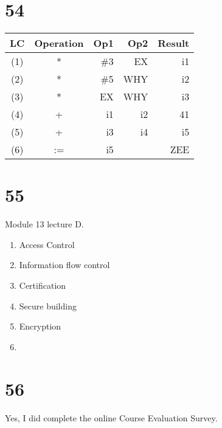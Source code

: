 \documentclass[a4paper,11pt]{article}
\begin{document}
\section*{54}
\begin{tabular}{ | c | c | r | r | r |}
  \hline
    LC & Operation & Op1 & Op2 & Result  \\ \hline
    (1) & * & \#3 & EX & i1 \\ \hline
    (2) & * & \#5 & WHY & i2 \\ \hline
    (3) & * & EX & WHY & i3 \\ \hline
    (4) & + & i1 & i2 & 41 \\ \hline
    (5) & + & i3 & i4 & i5 \\ \hline
    (6) & := & i5 &  & ZEE \\ \hline
\end{tabular}



\section*{55}
Module 13 lecture D.
\begin{enumerate}
  \item  Access Control
  \item  Information flow control
  \item  Certification
  \item  Secure building
  \item  Encryption
  \item
\end{enumerate}



\section*{56}
Yes, I did complete the online Course Evaluation Survey.

\end{document}
